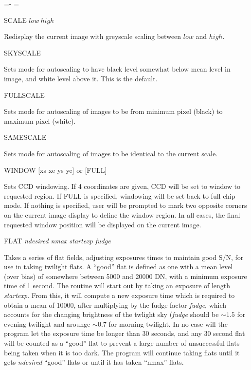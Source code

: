 \documentclass[10pt]{report}
\newenvironment{hanging}{
	\begin{list}{}{
		\labelsep=0pt
		\labelwidth=0pt
		\listparindent=0pt
		\itemindent=-\leftmargini
		\leftmargin=\leftmargini
	}
}{
	\end{list}
}
\begin{document}
\begin{hanging}
\item{SCALE $low\ high$}

Redisplay the current image with greyscale scaling between $low$ and $high$.

\item{SKYSCALE}

Sets mode for autoscaling to have black level somewhat below mean level in
image, and white level above it. This is the default.

\item{FULLSCALE}

Sets mode for autoscaling of images to be from minimum pixel (black) to
maximum pixel (white).

\item{SAMESCALE}

Sets mode for autoscaling of images to be identical to the current scale.

%

\item{WINDOW  [xs xe ys ye] or [FULL]}

Sets CCD windowing. If 4 coordinates are given, CCD will be set to window
to requested region. If FULL is specified, windowing will be set back to
full chip mode. If nothing is specified, user will be prompted to mark
two opposite corners on the current image display to define the window
region. In all cases, the final requested window position will be displayed
on the current image.

\item{FLAT \textit{ndesired nmax startexp fudge}}

Takes a series of flat fields, adjusting exposures times to maintain good
S/N, for use in taking twilight flats. A ``good'' flat is defined as one
with a mean level (over bias) of somewhere between 5000 and 20000 DN, with
a minimum exposure time of 1 second. The
routine will start out by taking an exposure of length \textit{startexp}.
From this, it will compute a new exposure time which is required to obtain
a mean of 10000, after multiplying by the fudge factor \textit{fudge},
which accounts for the changing brightness of the twlight sky (\textit{fudge}
should be $\sim 1.5$ for evening twilight and arounge $\sim 0.7$ for
morning twilight. In no case will the program let the exposure time be longer
than 30 seconds, and any 30 second flat will be counted as a ``good'' flat
to prevent a large number of unsuccessful flats being taken when it is too
dark.  The program will continue taking flats until it gets
\textit{ndesired} ``good'' flats or until it has taken ``nmax'' flats.


\end{hanging}
\end{document}
